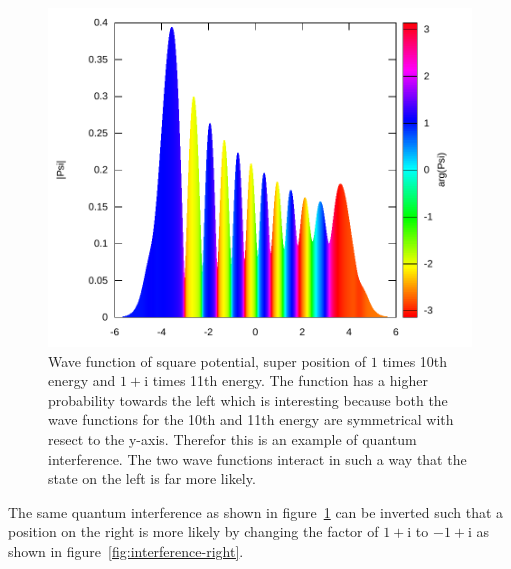 \documentclass[11pt,DIV=10,final]{scrreprt} %
\newcommand{\mi}{{\text{i}}}
\begin{document}
{\begin{minipage}{\textwidth}
\begin{figure}[H]
\centering
\includegraphics[width=\textwidth]{plots/super-square-10_1-11_1+i.pdf}
\caption{\label{fig:interfence-left}Wave function of square potential, super position of $1$ times 10th energy and $1+\mi$ times 11th energy. The function has a higher probability towards the left which
  is interesting because both the wave functions for the 10th and 11th energy are symmetrical with resect to the y-axis. Therefor this is an example of quantum interference. The two wave functions
  interact in such a way that the state on the left is far more likely.}
\end{figure}
The same quantum interference as shown in figure~\ref{fig:interfence-left} can be inverted such that a position on the right is more likely by changing the factor of $1+\mi$ to $-1+\mi$ as shown in
figure~\ref{fig:interference-right}.
\end{minipage}

}
\end{document}
